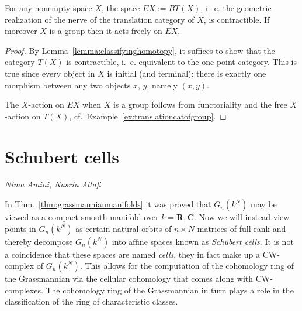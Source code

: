 \documentclass[a4paper,openany]{scrbook}
\newcommand{\chapterauthor}[1]{\hfill\emph{#1}\par\noindent}
\begin{document}
\begin{corollary}\label{cor:EG}
For any nonempty space $X$, the space $EX := BT(X)$, i.~e. the geometric realization of the nerve of the translation category of $X$, is contractible. If moreover $X$ is a group then it acts freely on $EX$.
\end{corollary}
\begin{proof}
By Lemma~\ref{lemma:classifyinghomotopy}, it suffices to show that the category $T(X)$ is contractible, i.~e. equivalent to the one-point category. This is true since every object in $X$ is initial (and terminal): there is exactly one morphism between any two objects $x$, $y$, namely $(x,y)$.

The $X$-action on $EX$ when $X$ is a group follows from functoriality and the free $X$-action on $T(X)$, cf.~Example~\ref{ex:translationcatofgroup}.
\end{proof}

\section{Schubert cells}


\chapterauthor{Nima Amini, Nasrin Altafi}

In Thm.~\ref{thm:grassmannianmanifolds} it was proved that $G_n(k^N)$ may be viewed as a compact smooth manifold over $k = \mathbf{R}, \mathbf{C}$. 
Now we will instead view points in $G_n(k^N)$ as certain natural orbits of $n \times N$ matrices of full rank and thereby decompose $G_n(k^N)$ into affine spaces known as \textit{Schubert cells}. 
It is not a coincidence that these spaces are named \textit{cells}, they in fact make up a CW-complex of $G_n(k^N)$. 
This allows for the computation of the cohomology ring of the Grassmannian via the cellular cohomology that comes along with CW-complexes. 
The cohomology ring of the Grassmannian in turn plays a role in the classification of the ring of characteristic classes. 
\end{document}

